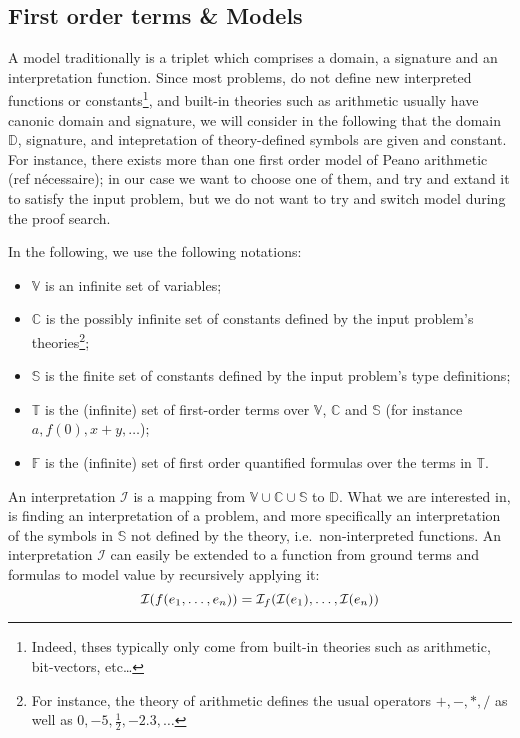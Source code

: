 \documentclass{article}
\begin{document}
\subsection{First order terms \& Models}

A model traditionally is a triplet which comprises a domain,
a signature and an interpretation function. Since most problems, do not
define new interpreted functions or constants\footnote{Indeed, thses typically
only come from built-in theories such as arithmetic, bit-vectors, etc\ldots},
and built-in theories such as arithmetic usually have canonic domain and signature,
we will consider in the following that the domain $\mathbb{D}$, signature, and
intepretation of theory-defined symbols are given and constant. For instance,
there exists more than one first order model of Peano arithmetic (ref nécessaire);
in our case we want to choose one of them, and try and extand it to satisfy the
input problem, but we do not want to try and switch model during the proof search.

In the following, we use the following notations:
\begin{itemize}
  \item $\mathbb{V}$ is an infinite set of variables;
  \item $\mathbb{C}$ is the possibly infinite set of constants defined
    by the input problem's theories\footnote{For instance, the theory of arithmetic
    defines the usual operators $+, -, *, /$ as well as $0, -5, \frac{1}{2}, -2.3, \ldots$};
  \item $\mathbb{S}$ is the finite set of constants defined by the input problem's type
    definitions;
  \item $\mathbb{T}$ is the (infinite) set of first-order terms over $\mathbb{V}$, $\mathbb{C}$
    and $\mathbb{S}$ (for instance $a, f(0), x + y, \ldots$);
  \item $\mathbb{F}$ is the (infinite) set of first order quantified formulas
    over the terms in $\mathbb{T}$.
\end{itemize}

An interpretation $\mathcal{I}$ is a mapping from $\mathbb{V} \cup \mathbb{C} \cup \mathbb{S}$
to $\mathbb{D}$. What we are interested in, is finding an interpretation of a problem, and more
specifically an interpretation of the symbols in $\mathbb{S}$ not defined by
the theory, i.e.~non-interpreted functions.
An interpretation $\mathcal{I}$ can easily be extended to a function from ground terms
and formulas to model value by recursively applying it:
\[
  \mathcal{I}( f ( e_1, \ldots, e_n ) ) =
  \mathcal{I}_f ( \mathcal{I}(e_1), \ldots, \mathcal{I}(e_n) ) \\
\]
\end{document}
